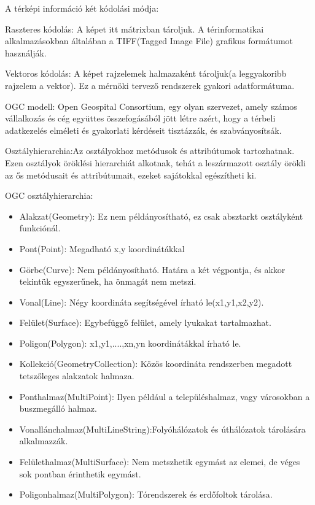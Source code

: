 A térképi információ két kódolási módja:

Raszteres kódolás: A képet itt mátrixban tároljuk. A térinformatikai alkalmazásokban általában a TIFF(Tagged Image File) grafikus formátumot használják.


Vektoros kódolás: A képet rajzelemek halmazaként tároljuk(a leggyakoribb rajzelem a vektor). Ez a mérnöki tervező rendszerek gyakori adatformátuma.

OGC modell: Open Geospital Consortium, egy olyan szervezet, amely számos vállalkozás és cég együttes összefogásából jött létre azért, hogy a térbeli adatkezelés elméleti és gyakorlati kérdéseit tisztázzák, és szabványosítsák. 

Osztályhierarchia:Az osztályokhoz metódusok és attribútumok tartozhatnak. Ezen osztályok öröklési hierarchiát alkotnak, tehát a leszármazott osztály örökli az ős metódusait és attribútumait, ezeket sajátokkal egészítheti ki. 

OGC osztályhierarchia:
\begin{itemize}  
\item Alakzat(Geometry): Ez nem példányosítható, ez csak absztarkt osztályként funkciónál.
\item Pont(Point): Megadható x,y koordinátákkal
\item Görbe(Curve): Nem példányosítható. Határa a két végpontja, és akkor tekintük egyszerűnek, ha önmagát nem metszi.
\item Vonal(Line): Négy koordináta segítségével írható le(x1,y1,x2,y2).
\item Felület(Surface): Egybefüggő felület, amely lyukakat tartalmazhat.
\item Poligon(Polygon): x1,y1,....,xn,yn koordinátákkal írható le.
\item Kollekció(GeometryCollection): Közös koordináta rendszerben megadott tetszőleges alakzatok halmaza.
\item Ponthalmaz(MultiPoint): Ilyen például a településhalmaz, vagy városokban a buszmegálló halmaz. 
\item Vonallánchalmaz(MultiLineString):Folyóhálózatok és úthálózatok tárolására alkalmazzák.
\item Felülethalmaz(MultiSurface): Nem metszhetik egymást az elemei, de véges sok pontban érinthetik egymást.
\item Poligonhalmaz(MultiPolygon): Tórendszerek és erdőfoltok tárolása.
\end{itemize}



